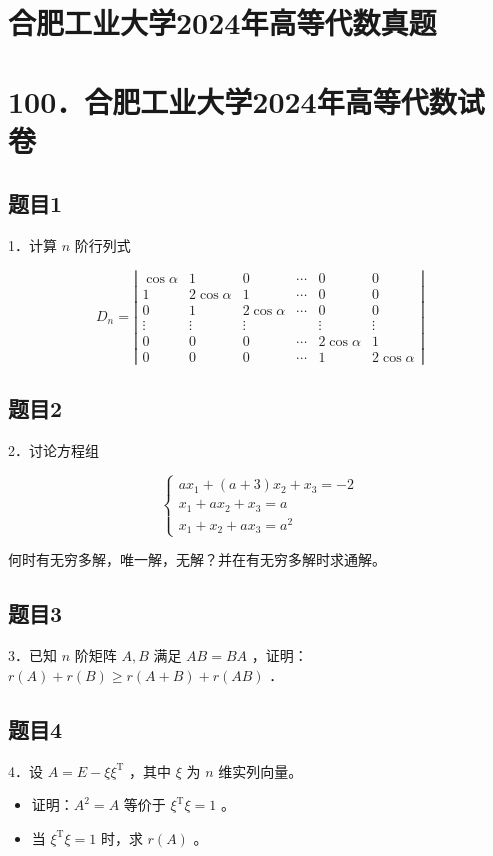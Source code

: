 \documentclass{article}
\begin{document}
\section*{合肥工业大学2024年高等代数真题}
\section*{100．合肥工业大学2024年高等代数试卷}

\subsection{题目1}
1．计算 \(n\) 阶行列式

\[
D_{n}=\left|\begin{array}{cccccc}
\cos \alpha & 1 & 0 & \cdots & 0 & 0 \\
1 & 2 \cos \alpha & 1 & \cdots & 0 & 0 \\
0 & 1 & 2 \cos \alpha & \cdots & 0 & 0 \\
\vdots & \vdots & \vdots & & \vdots & \vdots \\
0 & 0 & 0 & \cdots & 2 \cos \alpha & 1 \\
0 & 0 & 0 & \cdots & 1 & 2 \cos \alpha
\end{array}\right|
\]

\subsection{题目2}
2．讨论方程组

\[
\left\{\begin{array}{l}
a x_{1}+(a+3) x_{2}+x_{3}=-2 \\
x_{1}+a x_{2}+x_{3}=a \\
x_{1}+x_{2}+a x_{3}=a^{2}
\end{array}\right.
\]

何时有无穷多解，唯一解，无解？并在有无穷多解时求通解。

\subsection{题目3}
3．已知 \(n\) 阶矩阵 \(A, B\) 满足 \(A B=B A\) ，证明：\(r(A)+r(B) \geq r(A+B)+r(A B)\) ．

\subsection{题目4}
4．设 \(A=E-\xi \xi^{\mathrm{T}}\) ，其中 \(\xi\) 为 \(n\) 维实列向量。

\begin{itemize}
  \item[（1）] 证明：\(A^{2}=A\) 等价于 \(\xi^{\mathrm{T}} \xi=1\) 。
  \item[（2）] 当 \(\xi^{\mathrm{T}} \xi=1\) 时，求 \(r(A)\) 。
\end{itemize}
\end{document}

